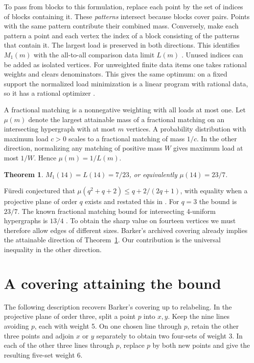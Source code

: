 \documentclass[11pt]{article}
\newtheorem{theorem}{Theorem}
\begin{document}
To pass from blocks to this formulation, replace each point by the set
of indices of blocks containing it. These \emph{patterns} intersect
because blocks cover pairs. Points with the same pattern contribute their
combined mass. Conversely, make each pattern a point and each vertex
the index of a block consisting of the patterns that contain it.
The largest load is preserved in both directions. This identifies
\(M_1(m)\) with the all-to-all comparison data limit \(L(m)\)
\cite[Lemma~3.1]{hhs}. Unused indices can be added as isolated vertices.
For unweighted finite data items one takes rational weights and clears
denominators. This gives the same optimum: on a fixed support the
normalized load minimization is a linear program with rational data,
so it has a rational optimizer \cite[Lemmas~3.1 and 3.4]{hhs}.

A fractional matching is a nonnegative weighting with all loads at
most one. Let \(\mu(m)\) denote the largest attainable mass of a
fractional matching on an intersecting hypergraph with at most \(m\)
vertices. A probability distribution with maximum load \(c>0\) scales
to a fractional matching of mass \(1/c\). In the other direction,
normalizing any matching of positive mass \(W\) gives maximum load at
most \(1/W\). Hence \(\mu(m)=1/L(m)\).

\begin{theorem}\label{thm:main}
\(M_1(14)=L(14)=7/23\), or equivalently \(\mu(14)=23/7\).
\end{theorem}

F\"uredi conjectured that \(\mu(q^2+q+2)\le q+2/(2q+1)\), with equality
when a projective plane of order \(q\) exists
\cite[Conjecture (6.3)]{furedi90} and restated this in
\cite[Conjecture 4.9]{furedi94}.
For \(q=3\) the bound is \(23/7\). The known fractional matching bound
for intersecting 4-uniform hypergraphs is \(13/4\) \cite{furedi}.
To obtain the sharp value on fourteen vertices we must therefore allow
edges of different sizes. Barker's archived covering \cite{barker}
already implies the attainable direction of Theorem~\ref{thm:main}.
Our contribution is the universal inequality in the other direction.

\section{A covering attaining the bound}
The following description recovers Barker's covering up to relabeling.
In the projective plane of order three, split a point \(p\) into \(x,y\).
Keep the nine lines avoiding \(p\), each with weight 5. On one chosen
line through \(p\), retain the other three points and adjoin \(x\) or
\(y\) separately to obtain two four-sets of weight 3. In each of the
other three lines through \(p\), replace \(p\) by both new points and
give the resulting five-set weight 6.
\end{document}
